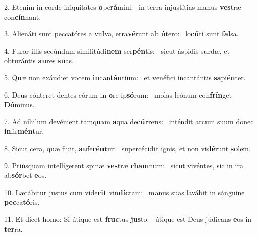 2. Etenim in corde iniquitátes \textbf{o}pe\textbf{rá}mini: \ast\  in terra injustítias manus \textbf{ves}træ con\textbf{cín}nant.\

3. Alienáti sunt peccatóres a vulva, erra\textbf{vé}runt ab \textbf{ú}tero: \ast\  lo\textbf{cú}ti sunt \textbf{fal}sa.\

4. Furor illis secúndum similitúdi\textbf{nem} ser\textbf{pén}tis: \ast\  sicut áspidis surdæ, et obturántis \textbf{au}res \textbf{su}as.\

5. Quæ non exáudiet vocem \textbf{in}can\textbf{tán}tium: \ast\  et venéfici incantántis \textbf{sa}pi\textbf{én}ter.\

6. Deus cónteret dentes eórum in \textbf{o}re ip\textbf{só}rum: \ast\  molas leónum con\textbf{frín}get \textbf{Dó}minus.\

7. Ad níhilum devénient tamquam \textbf{a}qua de\textbf{cúr}rens: \ast\  inténdit arcum suum donec \textbf{in}fir\textbf{mén}tur.\

8. Sicut cera, quæ fluit, \textbf{au}fe\textbf{rén}tur: \ast\  supercécidit ignis, et non vi\textbf{dé}runt \textbf{so}lem.\

9. Priúsquam intellígerent spinæ \textbf{ves}træ \textbf{rham}num: \ast\  sicut vivéntes, sic in ira ab\textbf{sór}bet \textbf{e}os.\

10. Lætábitur justus cum víde\textbf{rit} vin\textbf{díc}tam: \ast\  manus suas lavábit in sánguine \textbf{pec}ca\textbf{tó}ris.\

11. Et dicet homo: Si útique est \textbf{fruc}tus \textbf{jus}to: \ast\  útique est Deus júdicans \textbf{e}os in \textbf{ter}ra.\

